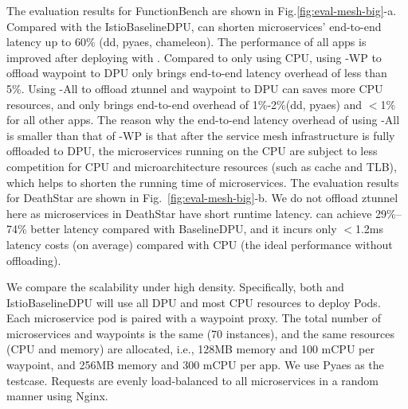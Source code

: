 The evaluation results for FunctionBench are shown in Fig.\ref{fig:eval-mesh-big}-a.
Compared with the IstioBaselineDPU, \mesh can shorten microservices' end-to-end latency up to 60\% (dd, pyaes, chameleon). 
The performance of all apps is improved after deploying with \mesh.
Compared to only using CPU, using \mesh-WP to offload waypoint to DPU only brings end-to-end latency overhead of less than 5\%.
Using \mesh-All to offload ztunnel and waypoint to DPU can saves more CPU resources, and only brings end-to-end overhead of 1\%-2\%(dd, pyaes)  and $<$1\% for all other apps.
The reason why the end-to-end latency overhead of using \mesh-All is smaller than that of \mesh-WP is that after the service mesh infrastructure is fully offloaded to DPU, the microservices running on the CPU are subject to less competition for CPU and microarchitecture resources (such as cache and TLB), which helps to shorten the running time of microservices.
The evaluation results for DeathStar are shown in Fig.~\ref{fig:eval-mesh-big}-b.
We do not offload ztunnel here as microservices in DeathStar have short runtime latency.
\mesh can achieve 29\%--74\% better latency compared with BaselineDPU, and it incurs only $<$1.2ms latency costs (on average) compared with CPU (the ideal performance without offloading).

We compare the scalability under high density.
Specifically, both \mesh and IstioBaselineDPU will use all DPU and most CPU resources to deploy Pods.
Each microservice pod is paired with a waypoint proxy.
The total number of microservices and waypoints is the same (70 instances), and the same resources (CPU and memory) are allocated, i.e., 128MB memory and 100 mCPU per waypoint, and 256MB memory and 300 mCPU per app.
We use Pyaes as the testcase.
Requests are evenly load-balanced to all microservices in a random manner using Nginx.

